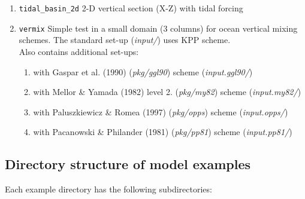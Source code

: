 \begin{enumerate}
\item \texttt{tidal\_basin\_2d} 2-D vertical section (X-Z) with tidal forcing

\item \texttt{vermix} Simple test in a small domain (3 columns) for
  ocean vertical mixing schemes. The standard set-up ({\it input/}) uses
  KPP scheme.\\
  Also contains additional set-ups:
  \begin{enumerate}
   \item with Gaspar et al. (1990) ({\it pkg/ggl90}) scheme ({\it input.ggl90/})
   \item with Mellor \& Yamada (1982) level 2. ({\it pkg/my82}) scheme ({\it input.my82/})
   \item with Paluszkiewicz \& Romea (1997) ({\it pkg/opps}) scheme ({\it input.opps/})
   \item with Pacanowski \& Philander (1981) ({\it pkg/pp81}) scheme ({\it input.pp81/})
  \end{enumerate}

\end{enumerate}

\subsection{Directory structure of model examples}

Each example directory has the following subdirectories:

